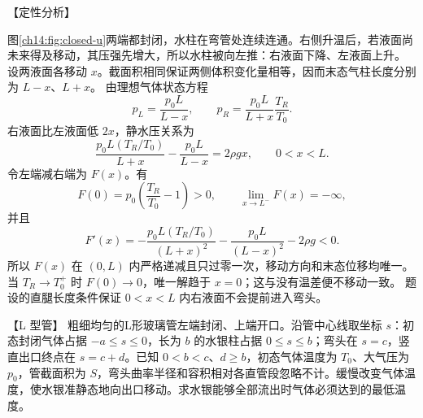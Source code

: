 {\begin{origexamplebox}{【定性分析】}
\closedUTubeDiagram
\end{origexamplebox}

\begin{xesolution}
\ThAUTube

图\ref{ch14:fig:closed-u}两端都封闭，水柱在弯管处连续连通。右侧升温后，若液面尚未来得及移动，其压强先增大，所以水柱被向左推：右液面下降、左液面上升。
设两液面各移动 $x$。截面积相同保证两侧体积变化量相等，因而末态气柱长度分别为 $L-x$、$L+x$。
由理想气体状态方程
\[
 p_L=\frac{p_0L}{L-x},\qquad
 p_R=\frac{p_0L}{L+x}\frac{T_R}{T_0}.
\]
右液面比左液面低 $2x$，静水压关系为
\[
 \boxed{\frac{p_0L(T_R/T_0)}{L+x}-\frac{p_0L}{L-x}=2\rho gx},
 \qquad 0<x<L.
\]
令左端减右端为 $F(x)$。有
\[
 F(0)=p_0\!\left(\frac{T_R}{T_0}-1\right)>0,\qquad
 \lim_{x\to L^-}F(x)=-\infty,
\]
并且
\[
 F'(x)=-\frac{p_0L(T_R/T_0)}{(L+x)^2}
       -\frac{p_0L}{(L-x)^2}-2\rho g<0.
\]
所以 $F(x)$ 在 $(0,L)$ 内严格递减且只过零一次，移动方向和末态位移均唯一。
当 $T_R\to T_0^+$ 时 $F(0)\to0$，唯一解趋于 $x=0$；这与没有温差便不移动一致。
题设的直腿长度条件保证 $0<x<L$ 内右液面不会提前进入弯头。
\end{xesolution}

\begin{origexamplebox}{【L 型管】}\label{ch14:ex:s28-19-10}
粗细均匀的L形玻璃管左端封闭、上端开口。沿管中心线取坐标 $s$：初态封闭气体占据
$-a\le s\le0$，长为 $b$ 的水银柱占据 $0\le s\le b$；弯头在 $s=c$，竖直出口终点在
$s=c+d$。已知 $0<b<c$、$d\ge b$，初态气体温度为 $T_0$、大气压为 $p_0$，管截面积为
$S$，弯头曲率半径和容积相对各直管段忽略不计。缓慢改变气体温度，使水银准静态地向出口移动。求水银能够全部流出时气体必须达到的最低温度。


\lPipeInitialDiagram
\end{origexamplebox}

}
